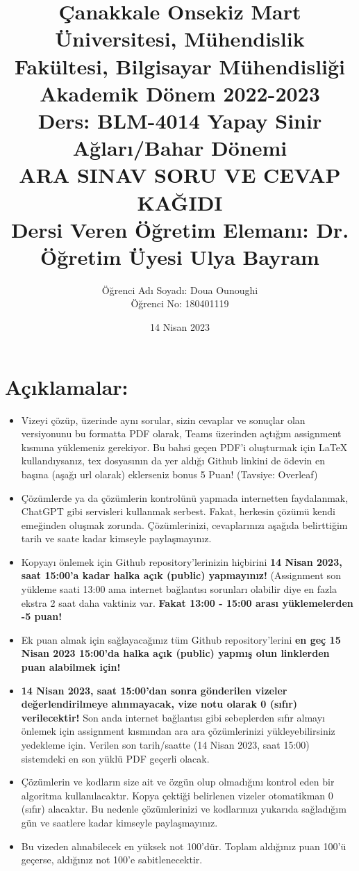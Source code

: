 \documentclass[11pt]{article}
\title{Çanakkale Onsekiz Mart Üniversitesi, Mühendislik Fakültesi, Bilgisayar Mühendisliği Akademik Dönem 2022-2023\\
Ders: BLM-4014 Yapay Sinir Ağları/Bahar Dönemi\\ 
ARA SINAV SORU VE CEVAP KAĞIDI\\
Dersi Veren Öğretim Elemanı: Dr. Öğretim Üyesi Ulya Bayram}
\author{%
\begin{minipage}{\textwidth}
\raggedright
Öğrenci Adı Soyadı: Doua Ounoughi\\ %
Öğrenci No: 180401119
\end{minipage}%
}
\date{14 Nisan 2023}
\begin{document}
\maketitle

\vspace{-.5in}
\section*{Açıklamalar:}
\begin{itemize}
    \item Vizeyi çözüp, üzerinde aynı sorular, sizin cevaplar ve sonuçlar olan versiyonunu bu formatta PDF olarak, Teams üzerinden açtığım assignment kısmına yüklemeniz gerekiyor. Bu bahsi geçen PDF'i oluşturmak için LaTeX kullandıysanız, tex dosyasının da yer aldığı Github linkini de ödevin en başına (aşağı url olarak) eklerseniz bonus 5 Puan! (Tavsiye: Overleaf)
    \item Çözümlerde ya da çözümlerin kontrolünü yapmada internetten faydalanmak, ChatGPT gibi servisleri kullanmak serbest. Fakat, herkesin çözümü kendi emeğinden oluşmak zorunda. Çözümlerinizi, cevaplarınızı aşağıda belirttiğim tarih ve saate kadar kimseyle paylaşmayınız. 
    \item Kopyayı önlemek için Github repository'lerinizin hiçbirini \textbf{14 Nisan 2023, saat 15:00'a kadar halka açık (public) yapmayınız!} (Assignment son yükleme saati 13:00 ama internet bağlantısı sorunları olabilir diye en fazla ekstra 2 saat daha vaktiniz var. \textbf{Fakat 13:00 - 15:00 arası yüklemelerden -5 puan!}
    \item Ek puan almak için sağlayacağınız tüm Github repository'lerini \textbf{en geç 15 Nisan 2023 15:00'da halka açık (public) yapmış olun linklerden puan alabilmek için!}
    \item \textbf{14 Nisan 2023, saat 15:00'dan sonra gönderilen vizeler değerlendirilmeye alınmayacak, vize notu olarak 0 (sıfır) verilecektir!} Son anda internet bağlantısı gibi sebeplerden sıfır almayı önlemek için assignment kısmından ara ara çözümlerinizi yükleyebilirsiniz yedekleme için. Verilen son tarih/saatte (14 Nisan 2023, saat 15:00) sistemdeki en son yüklü PDF geçerli olacak.
    \item Çözümlerin ve kodların size ait ve özgün olup olmadığını kontrol eden bir algoritma kullanılacaktır. Kopya çektiği belirlenen vizeler otomatikman 0 (sıfır) alacaktır. Bu nedenle çözümlerinizi ve kodlarınızı yukarıda sağladığım gün ve saatlere kadar kimseyle paylaşmayınız.
    \item Bu vizeden alınabilecek en yüksek not 100'dür. Toplam aldığınız puan 100'ü geçerse, aldığınız not 100'e sabitlenecektir.

\end{itemize}
\end{document}
